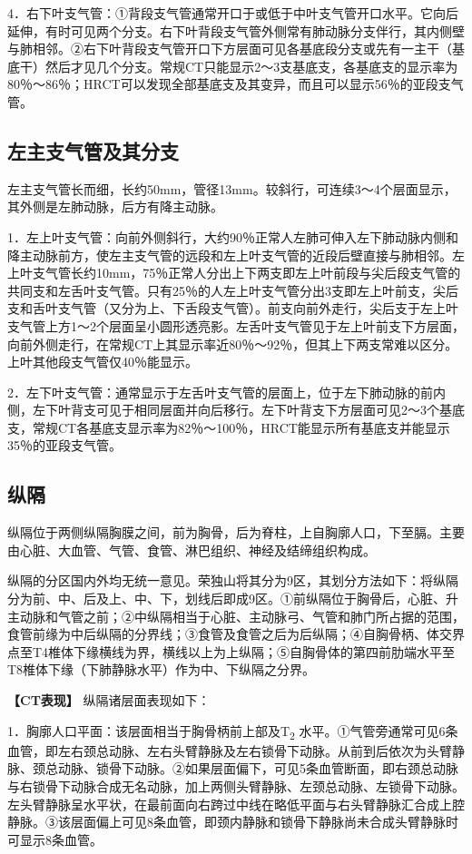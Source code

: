 4．右下叶支气管：①背段支气管通常开口于或低于中叶支气管开口水平。它向后延伸，有时可见两个分支。右下叶背段支气管外侧常有肺动脉分支伴行，其内侧壁与肺相邻。②右下叶背段支气管开口下方层面可见各基底段分支或先有一主干（基底干）然后才见几个分支。常规CT只能显示2～3支基底支，各基底支的显示率为80％～86％；HRCT可以发现全部基底支及其变异，而且可以显示56％的亚段支气管。

\subsection{左主支气管及其分支}

左主支气管长而细，长约50mm，管径13mm。较斜行，可连续3～4个层面显示，其外侧是左肺动脉，后方有降主动脉。

1．左上叶支气管：向前外侧斜行，大约90％正常人左肺可伸入左下肺动脉内侧和降主动脉前方，使左主支气管的远段和左上叶支气管的近段后壁直接与肺相邻。左上叶支气管长约10mm，75％正常人分出上下两支即左上叶前段与尖后段支气管的共同支和左舌叶支气管。只有25％的人左上叶支气管分出3支即左上叶前支，尖后支和舌叶支气管（又分为上、下舌段支气管）。前支向前外走行，尖后支于左上叶支气管上方1～2个层面呈小圆形透亮影。左舌叶支气管见于左上叶前支下方层面，向前外侧走行，在常规CT上其显示率近80％～92％，但其上下两支常难以区分。上叶其他段支气管仅40％能显示。

2．左下叶支气管：通常显示于左舌叶支气管的层面上，位于左下肺动脉的前内侧，左下叶背支可见于相同层面并向后移行。左下叶背支下方层面可见2～3个基底支，常规CT各基底支显示率为82％～100％，HRCT能显示所有基底支并能显示35％的亚段支气管。

\subsection{纵隔}

纵隔位于两侧纵隔胸膜之间，前为胸骨，后为脊柱，上自胸廓人口，下至膈。主要由心脏、大血管、气管、食管、淋巴组织、神经及结缔组织构成。

纵隔的分区国内外均无统一意见。荣独山将其分为9区，其划分方法如下：将纵隔分为前、中、后及上、中、下，划线后即成9区。①前纵隔位于胸骨后，心脏、升主动脉和气管之前；②中纵隔相当于心脏、主动脉弓、气管和肺门所占据的范围，食管前缘为中后纵隔的分界线；③食管及食管之后为后纵隔；④自胸骨柄、体交界点至T4椎体下缘横线为界，横线以上为上纵隔；⑤自胸骨体的第四前肋端水平至T8椎体下缘（下肺静脉水平）作为中、下纵隔之分界。

\textbf{【CT表现】} 纵隔诸层面表现如下：

1．胸廓人口平面：该层面相当于胸骨柄前上部及T\textsubscript{2}
水平。①气管旁通常可见6条血管，即左右颈总动脉、左右头臂静脉及左右锁骨下动脉。从前到后依次为头臂静脉、颈总动脉、锁骨下动脉。②如果层面偏下，可见5条血管断面，即右颈总动脉与右锁骨下动脉合成无名动脉，加上两侧头臂静脉、左颈总动脉、左锁骨下动脉。左头臂静脉呈水平状，在最前面向右跨过中线在略低平面与右头臂静脉汇合成上腔静脉。③该层面偏上可见8条血管，即颈内静脉和锁骨下静脉尚未合成头臂静脉时可显示8条血管。

